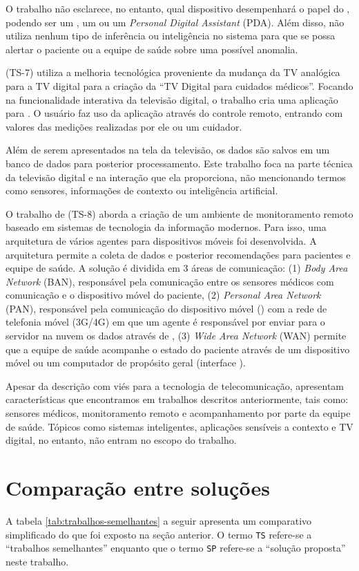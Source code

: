 O trabalho não esclarece, no entanto, qual dispositivo desempenhará o papel do
\gateway[], podendo ser um \tablet[], um \smartphone[] ou um \textit{Personal
Digital Assistant} (PDA). Além disso, não utiliza nenhum tipo de inferência ou
inteligência no sistema para que se possa alertar o paciente ou a equipe de
saúde sobre uma possível anomalia.

 (TS-7) utiliza a melhoria tecnológica proveniente da
mudança da TV analógica para a TV digital para a criação da ``TV Digital para
cuidados médicos''. Focando na funcionalidade interativa da televisão digital,
o trabalho cria uma aplicação para \stb[]. O usuário faz uso da aplicação através
do controle remoto, entrando com valores das medições realizadas por ele ou um
cuidador. 

Além de serem apresentados na tela da televisão, os dados são salvos
em um banco de dados para posterior processamento. Este trabalho foca na parte
técnica da televisão digital e na interação que ela proporciona, não
mencionando termos como sensores, informações de contexto ou inteligência
artificial.

O trabalho de  (TS-8) aborda a criação de um ambiente de
monitoramento remoto baseado em sistemas de tecnologia da informação modernos.
Para isso, uma arquitetura de vários agentes para dispositivos móveis foi
desenvolvida. A arquitetura permite a coleta de dados e posterior recomendações
para pacientes e equipe de saúde. A solução é dividida em 3 áreas de
comunicação: (1) \textit{Body Area Network} (BAN), responsável pela comunicação
entre os sensores médicos com comunicação \bluetooth[] e o dispositivo móvel do
paciente,  (2) \textit{Personal Area Network} (PAN), responsável pela
comunicação do dispositivo móvel (\smartphone) com a rede de telefonia móvel
(3G/4G) em que um agente é responsável por enviar para o servidor na nuvem os dados
através de \webservices[],  (3) \textit{Wide Area Network} (WAN) permite que a equipe
de saúde acompanhe o estado do paciente através de um dispositivo móvel ou um
computador de propósito geral (interface \web).

Apesar da descrição com viés para a tecnologia de telecomunicação,
 apresentam características que encontramos em
trabalhos descritos anteriormente, tais como: sensores médicos, monitoramento
remoto e acompanhamento por parte da equipe de saúde. Tópicos como sistemas
inteligentes, aplicações sensíveis a contexto e TV digital, no entanto, não
entram no escopo do trabalho.

\section{Comparação entre soluções} \label{sec:comparacao}

A tabela \ref{tab:trabalhos-semelhantes} a seguir apresenta um comparativo
simplificado do que foi exposto na seção anterior. O termo \texttt{TS} refere-se
a ``trabalhos semelhantes'' enquanto que o termo \texttt{SP} refere-se a
``solução proposta'' neste trabalho.


